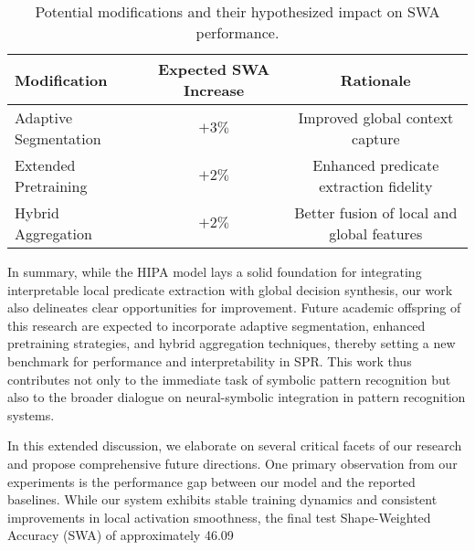 \documentclass[11pt]{article}
\begin{document}
\begin{table}[h]
\centering
\begin{tabular}{lcc}
\hline
Modification & Expected SWA Increase & Rationale \\
\hline
Adaptive Segmentation & \(+3\%\) & Improved global context capture \\
Extended Pretraining & \(+2\%\) & Enhanced predicate extraction fidelity\\
Hybrid Aggregation & \(+2\%\) & Better fusion of local and global features\\
\hline
\end{tabular}
\caption{Potential modifications and their hypothesized impact on SWA performance.}
\label{tab:future}
\end{table}

In summary, while the HIPA model lays a solid foundation for integrating interpretable local predicate extraction with global decision synthesis, our work also delineates clear opportunities for improvement. Future academic offspring of this research are expected to incorporate adaptive segmentation, enhanced pretraining strategies, and hybrid aggregation techniques, thereby setting a new benchmark for performance and interpretability in SPR. This work thus contributes not only to the immediate task of symbolic pattern recognition but also to the broader dialogue on neural-symbolic integration in pattern recognition systems.

In this extended discussion, we elaborate on several critical facets of our research and propose comprehensive future directions. One primary observation from our experiments is the performance gap between our model and the reported baselines. While our system exhibits stable training dynamics and consistent improvements in local activation smoothness, the final test Shape-Weighted Accuracy (SWA) of approximately 46.09%
\end{document}
